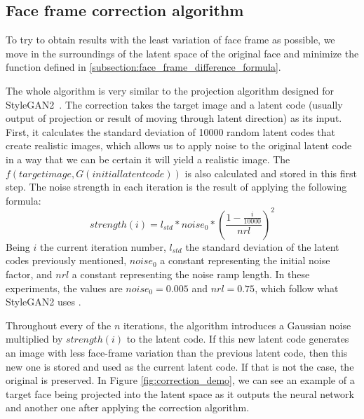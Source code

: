 \documentclass[review]{elsarticle}
\begin{document}
\subsection{Face frame correction algorithm}\label{subsection:face_frame_correction_algorithm}

To try to obtain results with the least variation of face frame as possible, we move in the surroundings of the latent space of the original face and minimize the function defined in \ref{subsection:face_frame_difference_formula}. 

The whole algorithm is very similar to the projection algorithm designed for StyleGAN2~\citep{stylegangithub}. The correction takes the target image and a latent code (usually output of projection or result of moving through latent direction) as its input. First, it calculates the standard deviation of 10000 random latent codes that create realistic images, which allows us to apply noise to the original latent code in a way that we can be certain it will yield a realistic image. The $f(target image, G(initial latent code))$ is also calculated and stored in this first step. The noise strength in each iteration is the result of applying the following formula:
\begin{equation}
strength(i) = l_{std} * noise_0 * (\frac{1-\frac{i}{10000}}{nrl}) ^{2}
\end{equation}
Being $i$ the current iteration number, $l_{std}$ the standard deviation of the latent codes previously mentioned, $noise_0$ a constant representing the initial noise factor, and $nrl$ a constant representing the noise ramp length. In these experiments, the values are $noise_0 = 0.005$ and $nrl = 0.75$, which follow what StyleGAN2 uses \citep{stylegangithub}.

Throughout every of the $n$ iterations, the algorithm introduces a Gaussian noise multiplied by $strength(i)$ to the latent code. If this new latent code generates an image with less face-frame variation than the previous latent code, then this new one is stored and used as the current latent code. If that is not the case, the original is preserved. In Figure \ref{fig:correction_demo}, we can see an example of a target face being projected into the latent space as it outputs the neural network and another one after applying the correction algorithm.
\end{document}
